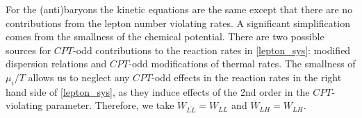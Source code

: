 \documentclass[12pt]{revtex4}
\newcommand{\ov}{\overline}
\begin{document}
	For the (anti)baryons the kinetic equations are the same except
	that there are no contributions from the lepton number violating
	rates. 
A significant simplification comes from the smallness of the chemical potential.
	There are two possible sources for $CPT$-odd contributions 
	to the reaction rates in \eqref{lepton_sys}: modified dispersion relations and 
	$CPT$-odd modifications of thermal rates.  The smallness of $\mu_i/T$ allows us to neglect 
	any $CPT$-odd effects in the reaction rates in the right hand side of 
	\eqref{lepton_sys}, as
	they induce effects of the 2nd order in the $CPT$-violating parameter. Therefore, 
we take
	$ W_{\ov{LL}} = W_{LL} $ and
	$ \ov{W}_{L{H}} = W_{L{H}} $.
\end{document}
